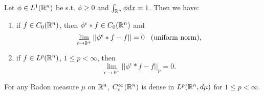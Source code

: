 \begin{proposition}
    Let $\phi\in L^1(\mathbb{R}^n)$ be s.t. $\phi\geq 0$ and $\int_{\mathbb{R}^n}\phi dx=1$. Then we have:
    \begin{enumerate}
        \item if $f\in C_0(\mathbb{R}^n)$, then $\phi^\epsilon *f\in C_0(\mathbb{R}^n)$ and \[\lim_{\epsilon\rightarrow 0^+}||\phi^\epsilon *f -f||=0 \hspace{3mm}\text{(uniform norm)}, \]
        \item if $f\in L^p(\mathbb{R}^n)$, $1\leq p<\infty$, then \[\lim_{\epsilon\rightarrow 0^+}||\phi^\epsilon *f -f||_p=0. \]
    \end{enumerate}

\end{proposition}
\begin{corollary}
    For any Radon measure $\mu$ on $\mathbb{R}^n$, $C_c^\infty(\mathbb{R}^n)$ is dense in $L^p(\mathbb{R}^n,d\mu)$ for $1\leq p<\infty$.
\end{corollary}